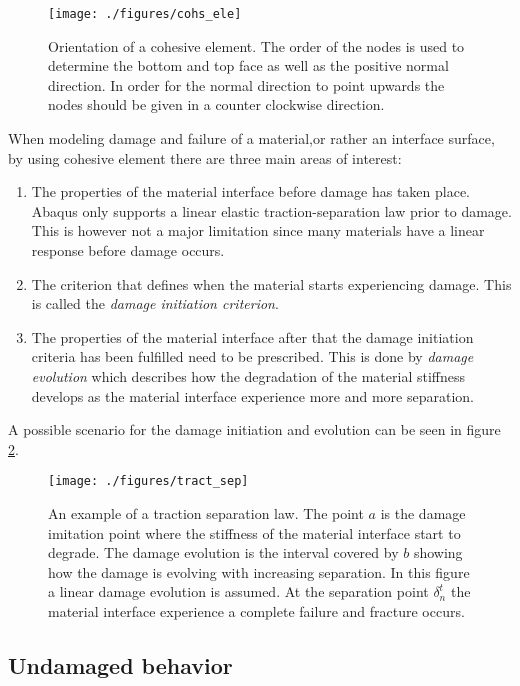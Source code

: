 \documentclass[grain_boundary_law.tex]{subfiles}
\begin{document}
\begin{figure}[htpb!]
\centering
 \texttt{[image: ./figures/cohs\_ele]}
\caption{Orientation of a cohesive element. The order of the nodes is used to determine the bottom and top face as well as the positive normal direction. In order for the normal direction to point upwards the nodes should be given in a counter clockwise direction.}
\label{fig:cohs_ori}
\end{figure}


When modeling damage and failure of a material,or rather an interface surface, by using cohesive element there are three main areas of interest:

\begin{enumerate}
\item The properties of the material interface before damage has taken place. Abaqus only supports a linear elastic traction-separation law prior to damage. This is however not a major limitation since many materials have a linear response before damage occurs. 

\item The criterion that defines when the material starts experiencing damage. This is called the \textit{damage initiation criterion}.

\item The properties of the material interface after that the damage initiation criteria has been fulfilled need to be prescribed. This is done by \textit{damage evolution} which describes how the degradation of the material stiffness develops as the material interface experience more and more separation.
\end{enumerate}
%
A possible scenario for the damage initiation and evolution can be seen in figure \ref{fig:tract_sep}.

\begin{figure}[htpb!]
\centering
  \texttt{[image: ./figures/tract\_sep]}
\caption{An example of a traction separation law. The point $a$ is the damage imitation point where the stiffness of the material interface start to degrade. The damage evolution is the interval covered by $b$ showing how the damage is evolving with increasing separation. In this figure a linear damage evolution is assumed. At the separation point $\delta_n^t$ the material interface experience a complete failure and fracture occurs.}
\label{fig:tract_sep}
\end{figure}

\subsection{Undamaged behavior}
 
\end{document}
